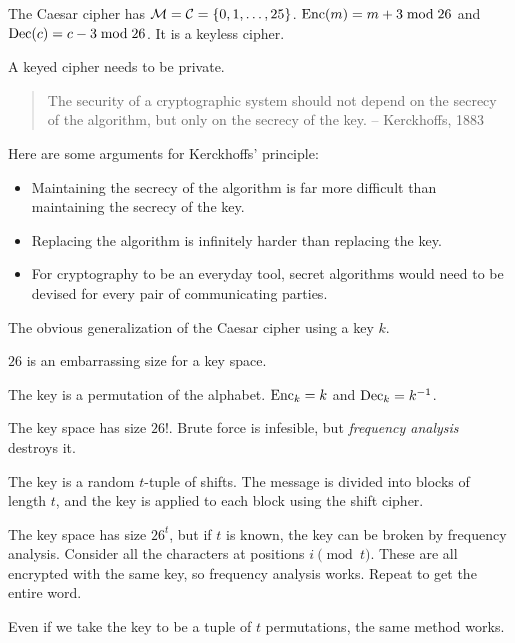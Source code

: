 \begin{example}
    The Caesar cipher has $\mathcal{M} = \mathcal{C} = \{0, 1, \dots, 25\}$.
    $\operatorname{Enc}(m) = m + 3 \bmod 26$ and $\operatorname{Dec}(c) = c - 3 \bmod 26$.
    It is a keyless cipher.
\end{example}
A keyed cipher needs to be private.

\begin{quotation}
    The security of a cryptographic system should not depend on the
    secrecy of the algorithm, but only on the secrecy of the key.
    -- Kerckhoffs, 1883
\end{quotation}

Here are some arguments for Kerckhoffs' principle:
\begin{itemize}
    \item Maintaining the secrecy of the algorithm is far more difficult
        than maintaining the secrecy of the key.
    \item Replacing the algorithm is infinitely harder than replacing
        the key.
    \item For cryptography to be an everyday tool, secret algorithms
        would need to be devised for every pair of communicating parties.
\end{itemize}

\begin{example}
    The obvious generalization of the Caesar cipher using a key $k$.
\end{example}
$26$ is an embarrassing size for a key space.

\begin{example}
    The key is a permutation of the alphabet.
    $\operatorname{Enc}_k = k$ and $\operatorname{Dec}_k = k^{-1}$.
\end{example}
The key space has size $26!$.
Brute force is infesible, but \emph{frequency analysis} destroys it.

\begin{example}
    The key is a random $t$-tuple of shifts.
    The message is divided into blocks of length $t$,
    and the key is applied to each block using the shift cipher.
\end{example}
The key space has size $26^t$, but if $t$ is known,
the key can be broken by frequency analysis.
Consider all the characters at positions $i \pmod t$.
These are all encrypted with the same key, so frequency analysis works.
Repeat to get the entire word.

Even if we take the key to be a tuple of $t$ permutations,
the same method works.
